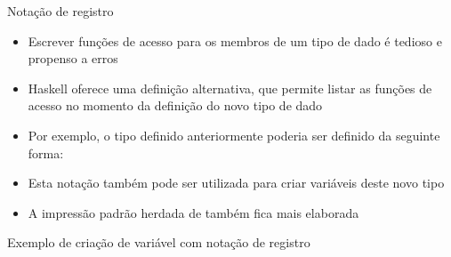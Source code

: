 \begin{frame}[fragile]{Notação de registro}

    \begin{itemize}
        \item Escrever funções de acesso para os membros de um tipo de dado é tedioso e
            propenso a erros

        \item Haskell oferece uma definição alternativa, que permite listar as funções de
            acesso no momento da definição do novo tipo de dado

        \item Por exemplo, o tipo  definido anteriormente poderia
            ser definido da seguinte forma:


        \item Esta notação também pode ser utilizada para criar variáveis deste novo tipo

        \item A impressão padrão herdada de  também fica mais elaborada
    \end{itemize}

\end{frame}

\begin{frame}[fragile]{Exemplo de criação de variável com notação de registro}
\end{frame}

